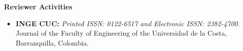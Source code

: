 {\bf\Large Reviewer \textcolor{my_blue}{Activities}}\\ \vspace*{-6mm}

\begin{itemize}

    \item {\bf INGE CUC:} {\small\em Printed ISSN: 0122-6517 and Electronic
          ISSN: 2382-4700}. Journal of the Faculty of Engineering of the Universidad de
          la Costa, Barranquilla, Colombia.

\end{itemize}